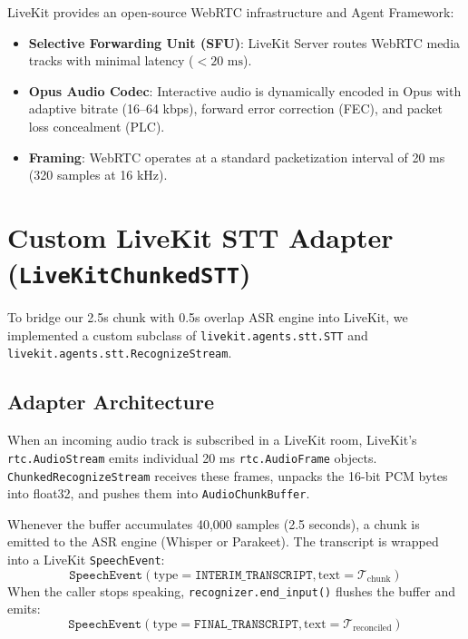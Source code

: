 \documentclass[11pt,a4paper,titlepage]{report}
\begin{document}
LiveKit provides an open-source WebRTC infrastructure and Agent Framework:
\begin{itemize}
    \item \textbf{Selective Forwarding Unit (SFU)}: LiveKit Server routes WebRTC media tracks with minimal latency ($<20\text{ ms}$).
    \item \textbf{Opus Audio Codec}: Interactive audio is dynamically encoded in Opus with adaptive bitrate (16--64 kbps), forward error correction (FEC), and packet loss concealment (PLC).
    \item \textbf{Framing}: WebRTC operates at a standard packetization interval of 20 ms (320 samples at 16 kHz).
\end{itemize}

\section{Custom LiveKit STT Adapter (\texttt{LiveKitChunkedSTT})}
To bridge our 2.5s chunk with 0.5s overlap ASR engine into LiveKit, we implemented a custom subclass of \texttt{livekit.agents.stt.STT} and \texttt{livekit.agents.stt.RecognizeStream}.

\subsection{Adapter Architecture}
When an incoming audio track is subscribed in a LiveKit room, LiveKit's \texttt{rtc.AudioStream} emits individual 20 ms \texttt{rtc.AudioFrame} objects. \texttt{ChunkedRecognizeStream} receives these frames, unpacks the 16-bit PCM bytes into float32, and pushes them into \texttt{AudioChunkBuffer}.

Whenever the buffer accumulates 40,000 samples (2.5 seconds), a chunk is emitted to the ASR engine (Whisper or Parakeet). The transcript is wrapped into a LiveKit \texttt{SpeechEvent}:
\begin{equation}
    \texttt{SpeechEvent}(\text{type} = \texttt{INTERIM\_TRANSCRIPT}, \text{text} = \mathcal{T}_{\text{chunk}})
\end{equation}
When the caller stops speaking, \texttt{recognizer.end\_input()} flushes the buffer and emits:
\begin{equation}
    \texttt{SpeechEvent}(\text{type} = \texttt{FINAL\_TRANSCRIPT}, \text{text} = \mathcal{T}_{\text{reconciled}})
\end{equation}
\end{document}
